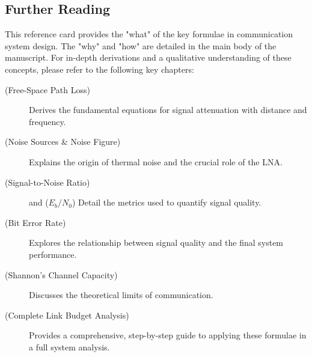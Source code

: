 \begin{importantbox}
\section*{Further Reading}
This reference card provides the "what" of the key formulae in communication system design. The "why" and "how" are detailed in the main body of the manuscript. For in-depth derivations and a qualitative understanding of these concepts, please refer to the following key chapters:
\begin{description}
    \item[ (Free-Space Path Loss)] Derives the fundamental equations for signal attenuation with distance and frequency.
    \item[ (Noise Sources \& Noise Figure)] Explains the origin of thermal noise and the crucial role of the LNA.
    \item[ (Signal-to-Noise Ratio)] and  (\(E_b/N_0\)) Detail the metrics used to quantify signal quality.
    \item[ (Bit Error Rate)] Explores the relationship between signal quality and the final system performance.
    \item[ (Shannon's Channel Capacity)] Discusses the theoretical limits of communication.
    \item[ (Complete Link Budget Analysis)] Provides a comprehensive, step-by-step guide to applying these formulae in a full system analysis.
\end{description}
\end{importantbox}